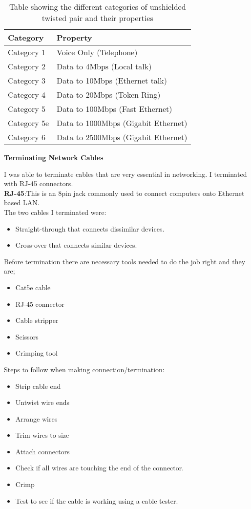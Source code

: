 \documentclass{article}
\begin{document}
\begin{table}[H]
\centering
\begin{tabu} to 0.8\textwidth { | X[c] | X[c] | }
 \hline
 \textbf{Category} & \textbf{Property}\\
 \hline
 Category 1 & Voice Only (Telephone)\\
\hline
 Category 2& Data to 4Mbps (Local talk) \\
\hline
 Category 3 & Data to 10Mbps (Ethernet talk)\\
\hline
 Category 4 & Data to 20Mbps (Token Ring)\\
\hline
 Category 5 & Data to 100Mbps (Fast Ethernet)\\
\hline
 Category 5e & Data to 1000Mbps (Gigabit Ethernet)\\
\hline
 Category 6 & Data to 2500Mbps (Gigabit Ethernet)\\
\hline
\end{tabu}
\caption{Table showing the different categories of unshielded twisted pair and their properties}
\label{table:2}
\end{table}
\textbf{Terminating Network Cables}
\par I was able to terminate cables that are very essential in networking. I terminated with RJ-45 connectors. \\
\textbf{RJ-45}:This is an 8pin jack commonly used to connect computers onto Ethernet based LAN.\\
The two cables I terminated were:
\begin{itemize}
\item Straight-through that connects dissimilar devices.
\item Cross-over that connects similar devices.
\end{itemize}
Before termination there are necessary tools needed to do the job right and they are;
\begin{itemize}
\item Cat5e cable
\item RJ-45 connector
\item Cable stripper
\item Scissors
\item Crimping tool
\end{itemize}
Steps to follow when making connection/termination:
\begin{itemize}
\item Strip cable end
\item Untwist wire ends
\item  Arrange wires
\item  Trim wires to size
\item  Attach connectors
\item  Check if all wires are touching the end of the connector.
\item  Crimp
\item  Test to see if the cable is working using a cable tester.
\end{itemize}
\end{document}
